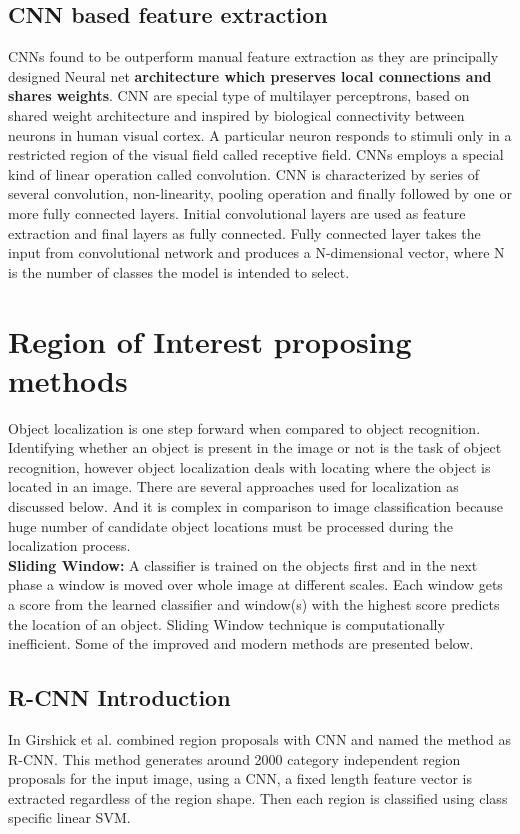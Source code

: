 \subsection{CNN based feature extraction}
\newpara CNNs found to be outperform manual feature extraction as they are principally designed Neural net \textbf{architecture which preserves local connections and shares weights}. CNN are special type of multilayer perceptrons, based on shared weight architecture and inspired by biological connectivity between neurons in human visual cortex. A particular neuron responds to stimuli only in a restricted region of the visual field called receptive field. CNNs employs a special kind of linear operation called convolution. CNN is characterized by series of several convolution, non-linearity, pooling operation and finally followed by one or more fully connected layers. Initial convolutional layers are used as feature extraction and final layers as fully connected. Fully connected layer takes the input from convolutional network and produces a N-dimensional vector, where N is the number of classes the model is intended to select.


\section{Region of Interest proposing methods}
Object localization is one step forward when compared to object recognition. Identifying whether an object is present in the image or not is the task of object recognition, however object localization deals with locating where the object is located in an image. There are several approaches used for localization as discussed below. And it is complex in comparison to image classification because huge number of candidate object locations must be processed during the localization process. \\

\textbf{Sliding Window:} A classifier is trained on the objects first and in the next phase a window is moved over whole image at different scales. Each window gets a score from the learned classifier and window(s) with the highest score predicts the location of an object. Sliding Window technique is computationally inefficient. Some of the improved and modern methods are presented below. 

\subsection{R-CNN Introduction}
In \cite{girshick2014rich} Girshick et al. combined region proposals with CNN and named the method as R-CNN. This method generates around 2000 category independent region proposals for the input image, using a CNN, a fixed length feature vector is extracted regardless of the region shape. Then each region is classified using class specific linear SVM. 

